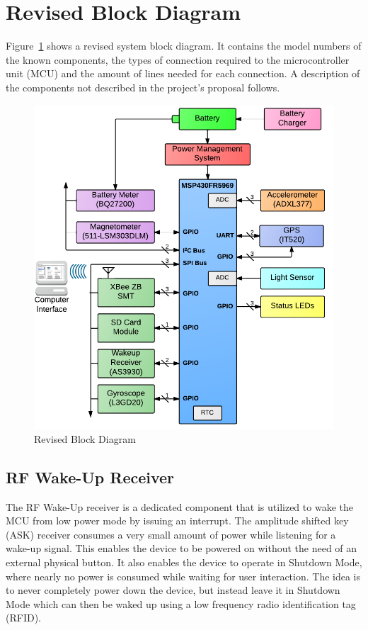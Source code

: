 \section{Revised Block Diagram}

Figure~\ref{fig:blockDiagram} shows a revised system block diagram.  It contains the model numbers of the known components, the types of connection required to the microcontroller unit (MCU) and the amount of lines needed for each connection.  A description of the components not described in the project's proposal follows.

\begin{figure}[H]
	\centering
	\includegraphics[width=\textwidth]{img/blockDiagramV2_2}
	\caption{Revised Block Diagram \label{fig:blockDiagram}}
\end{figure}

\subsection{RF Wake-Up Receiver}
The RF Wake-Up receiver is a dedicated component that is utilized to wake the MCU from low power mode by issuing an interrupt. The amplitude shifted key (ASK) receiver consumes a very small amount of power while listening for a wake-up signal. This enables the device to be powered on without the need of an external physical button. It also enables the device to operate in Shutdown Mode, where nearly no power is consumed while waiting for user interaction. The idea is to never completely power down the device, but instead leave it in Shutdown Mode which can then be waked up using a low frequency radio identification tag (RFID).

